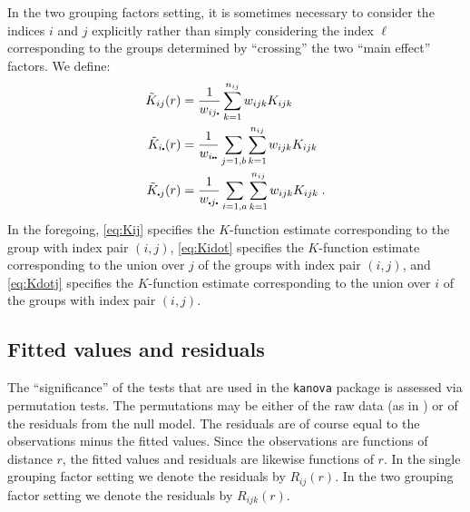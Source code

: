 \documentclass[12pt]{article}
\newcommand{\pullet}{\mbox{\scalebox{0.4}{$\bullet$}}}
\begin{document}
In the two grouping factors setting, it is sometimes necessary
to consider the indices $i$ and $j$ explicitly rather than simply
considering the index $\ell$ corresponding to the groups determined
by ``crossing'' the two ``main effect'' factors.  We define:
\begin{align}
\tilde{K}_{ij}(r)        &= \frac{1}{w_{ij \pullet}} \label{eq:Kij}
                            \sum_{k=1}^{n_{ij}} w_{ijk} K_{ijk} \\
\tilde{K}_{i\pullet}(r)  &= \frac{1}{w_{i \pullet \pullet}} \label{eq:Kidot}
                            \sum_{j=1,b} \sum_{k=1}^{n_{ij}} w_{ijk} K_{ijk} \\
\tilde{K}_{\pullet j}(r) &= \frac{1}{w_{\pullet j \pullet}} \label{eq:Kdotj}
                            \sum_{i=1,a} \sum_{k=1}^{n_{ij}} w_{ijk} K_{ijk} \;.
\end{align}
In the foregoing, \eqref{eq:Kij} specifies the $K$-function estimate
corresponding to the group with index pair $(i,j)$, \eqref{eq:Kidot}
specifies the $K$-function estimate corresponding to the union over
$j$ of the groups with index pair $(i,j)$, and \eqref{eq:Kdotj}
specifies the $K$-function estimate corresponding to the union over
$i$ of the groups with index pair $(i,j)$.

\subsection{Fitted values and residuals}
\label{sec:fitres}

The ``significance'' of the tests that are used in the
\texttt{kanova} package is assessed via permutation tests.  The
permutations may be either of the raw data (as in \citealt{Hahn2012})
or of the residuals from the null model.  The residuals are of
course equal to the observations minus the fitted values.  Since the
observations are functions of distance $r$, the fitted values and
residuals are likewise functions of $r$.  In the single grouping
factor setting we denote the residuals by $R_{ij}(r)$.  In the two
grouping factor setting we denote the residuals by $R_{ijk}(r)$.
\end{document}
